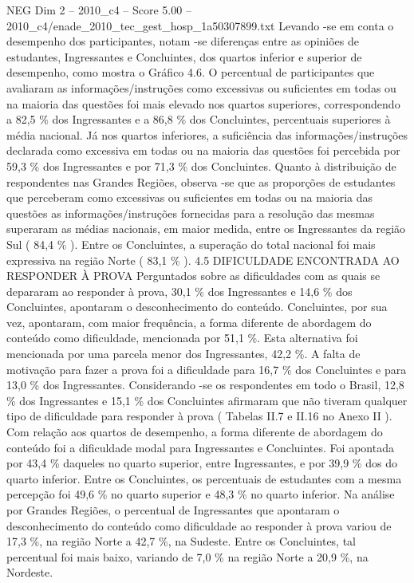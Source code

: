 \begin{textsample}{NEG Dim 2 – 2010\_c4 – Score 5.00 – 2010\_c4/enade\_2010\_tec\_gest\_hosp\_1a50307899.txt}
Levando -se em conta o desempenho dos participantes, notam -se diferenças entre as opiniões de estudantes, Ingressantes e Concluintes, dos quartos inferior e superior de desempenho, como mostra o Gráfico 4.6.
O percentual de participantes que avaliaram as informações/instruções como excessivas ou suficientes em todas ou na maioria das questões foi mais elevado nos quartos superiores, correspondendo a 82,5 \% dos Ingressantes e a 86,8 \% dos Concluintes, percentuais superiores à média nacional.
Já nos quartos inferiores, a suficiência das informações/instruções declarada como excessiva em todas ou na maioria das questões foi percebida por 59,3 \% dos Ingressantes e por 71,3 \% dos Concluintes.
Quanto à distribuição de respondentes nas Grandes Regiões, observa -se que as proporções de estudantes que perceberam como excessivas ou suficientes em todas ou na maioria das questões as informações/instruções fornecidas para a resolução das mesmas superaram as médias nacionais, em maior medida, entre os Ingressantes da região Sul ( 84,4 \% ).
Entre os Concluintes, a superação do total nacional foi mais expressiva na região Norte ( 83,1 \% ). 4.5 DIFICULDADE ENCONTRADA AO RESPONDER À PROVA Perguntados sobre as dificuldades com as quais se depararam ao responder à prova, 30,1 \% dos Ingressantes e 14,6 \% dos Concluintes, apontaram o desconhecimento do conteúdo.
Concluintes, por sua vez, apontaram, com maior frequência, a forma diferente de abordagem do conteúdo como dificuldade, mencionada por 51,1 \%.
Esta alternativa foi mencionada por uma parcela menor dos Ingressantes, 42,2 \%.
A falta de motivação para fazer a prova foi a dificuldade para 16,7 \% dos Concluintes e para 13,0 \% dos Ingressantes.
Considerando -se os respondentes em todo o Brasil, 12,8 \% dos Ingressantes e 15,1 \% dos Concluintes afirmaram que não tiveram qualquer tipo de dificuldade para responder à prova ( Tabelas II.7 e II.16 no Anexo II ).
Com relação aos quartos de desempenho, a forma diferente de abordagem do conteúdo foi a dificuldade modal para Ingressantes e Concluintes.
Foi apontada por 43,4 \% daqueles no quarto superior, entre Ingressantes, e por 39,9 \% dos do quarto inferior.
Entre os Concluintes, os percentuais de estudantes com a mesma percepção foi 49,6 \% no quarto superior e 48,3 \% no quarto inferior.
Na análise por Grandes Regiões, o percentual de Ingressantes que apontaram o desconhecimento do conteúdo como dificuldade ao responder à prova variou de 17,3 \%, na região Norte a 42,7 \%, na Sudeste.
Entre os Concluintes, tal percentual foi mais baixo, variando de 7,0 \% na região Norte a 20,9 \%, na Nordeste.

\end{textsample}

